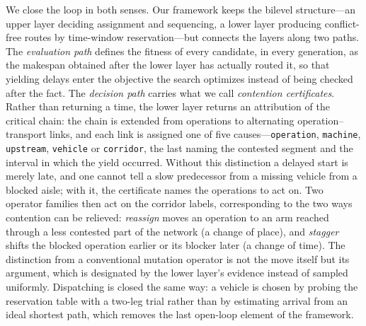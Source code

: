 \documentclass[manuscript,screen,review]{acmart}
\begin{document}
We close the loop in both senses. Our framework keeps the bilevel structure---an
upper layer deciding assignment and sequencing, a lower layer producing
conflict-free routes by time-window reservation---but connects the layers along
two paths. The \emph{evaluation path} defines the fitness of every candidate, in
every generation, as the makespan obtained after the lower layer has actually
routed it, so that yielding delays enter the objective the search optimizes
instead of being checked after the fact. The \emph{decision path} carries
what we call \emph{contention certificates}. Rather than returning a time, the
lower layer returns an attribution of the critical chain: the chain is extended
from operations to alternating operation--transport links, and each link is
assigned one of five causes---\texttt{operation}, \texttt{machine},
\texttt{upstream}, \texttt{vehicle} or \texttt{corridor}, the last naming the
contested segment and the interval in which the yield occurred. Without this
distinction a delayed start is merely late, and one cannot tell a slow
predecessor from a missing vehicle from a blocked aisle; with it, the certificate
names the operations to act on. Two operator families then act on the corridor
labels, corresponding to the two ways contention can be relieved: \emph{reassign}
moves an operation to an arm reached through a less contested part of the network
(a change of place), and \emph{stagger} shifts the blocked operation earlier or
its blocker later (a change of time). The distinction from a conventional
mutation operator is not the move itself but its argument, which is designated by
the lower layer's evidence instead of sampled uniformly. Dispatching is closed the
same way: a vehicle is chosen by probing the reservation table with a two-leg
trial rather than by estimating arrival from an ideal shortest path, which removes
the last open-loop element of the framework.
\end{document}
